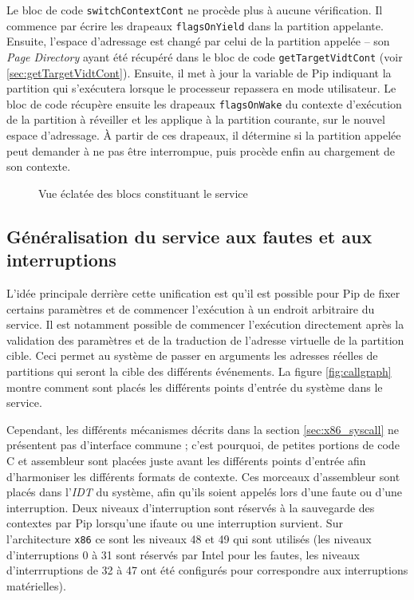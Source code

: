		Le bloc de code \texttt{switchContextCont} ne procède plus à aucune vérification. Il commence par écrire les drapeaux \texttt{flagsOnYield} dans la partition appelante. Ensuite, l'espace d'adressage est changé par celui de la partition appelée -- son \emph{Page Directory} ayant été récupéré dans le bloc de code \texttt{getTargetVidtCont} (voir \ref{sec:getTargetVidtCont}). Ensuite, il met à jour la variable de Pip indiquant la partition qui s'exécutera lorsque le processeur repassera en mode utilisateur. Le bloc de code récupère ensuite les drapeaux \texttt{flagsOnWake} du contexte d'exécution de la partition à réveiller et les applique à la partition courante, sur le nouvel espace d'adressage. À partir de ces drapeaux, il détermine si la partition appelée peut demander à ne pas être interrompue, puis procède enfin au chargement de son contexte.

		\newpage

		\begin{figure}[!ht]
			
			\caption{Vue éclatée des blocs constituant le service}
			\label{fig:callgraph_direct}
		\end{figure}
		\newpage

		\subsection{Généralisation du service aux fautes et aux interruptions}
		\label{sec:service_generalisation}

		L'idée principale derrière cette unification est qu'il est possible pour Pip de fixer certains paramètres et de commencer l'exécution à un endroit arbitraire du service. Il est notamment possible de commencer l'exécution directement après la validation des paramètres et de la traduction de l'adresse virtuelle de la partition cible. Ceci permet au système de passer en arguments les adresses réelles de partitions qui seront la cible des différents événements. La figure \ref{fig:callgraph} montre comment sont placés les différents points d'entrée du système dans le service.

		Cependant, les différents mécanismes décrits dans la section \ref{sec:x86_syscall} ne présentent pas d'interface commune ; c'est pourquoi, de petites portions de code C et assembleur sont placées juste avant les différents points d'entrée afin d'harmoniser les différents formats de contexte. Ces morceaux d'assembleur sont placés dans l'\emph{IDT} du système, afin qu'ils soient appelés lors d'une faute ou d'une interruption. Deux niveaux d'interruption sont réservés à la sauvegarde des contextes par Pip lorsqu'une ifaute ou une interruption survient. Sur l'architecture \texttt{x86} ce sont les niveaux 48 et 49 qui sont utilisés (les niveaux d'interruptions 0 à 31 sont réservés par Intel pour les fautes, les niveaux d'interrruptions de 32 à 47 ont été configurés pour correspondre aux interruptions matérielles).

